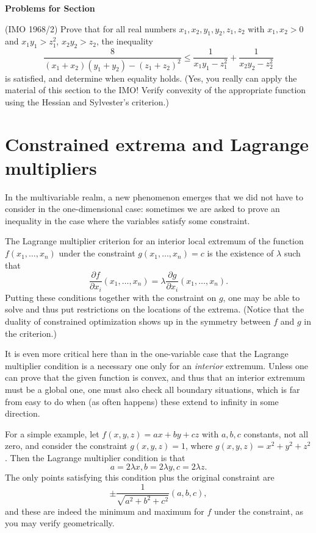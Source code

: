 \documentclass[12pt]{report}
\def\ii{\item}
\newcounter{exc}
\numberwithin{exc}{section}
\newenvironment{exer}{\vspace{0.1in}
\noindent \textbf{Problems for Section~\thesection} \vspace{0.1in}
\begin{list}{\arabic{exc}.}{\usecounter{exc}}}{\end{list}}
\begin{document}
\begin{exer}
\ii (IMO 1968/2)
Prove that for all real numbers $x_{1}, x_{2}, y_{1}, y_{2}, z_{1}, 
z_{2}$ with $x_{1}, x_{2} > 0$ and $x_{1}y_{1} > z_{1}^{2}$, 
$x_{2}y_{2} > z_2$, the inequality
\[
\frac{8}{(x_1+x_2)(y_1+y_2) - (z_1+z_2)^2} \leq 
\frac{1}{x_1y_1-z_1^2} + \frac{1}{x_2y_2-z_2^2}
\]
is satisfied, and determine when equality holds. (Yes, you really can 
apply the material of this section to the IMO! Verify 
convexity of the appropriate function using the Hessian and 
Sylvester's criterion.)
\end{exer}

\section{Constrained extrema and Lagrange multipliers}
In the multivariable realm, a new phenomenon emerges that we did not 
have to consider in the one-dimensional case: sometimes we are asked 
to prove an inequality in the case where the variables satisfy some 
constraint.

The Lagrange multiplier criterion for an interior local extremum of 
the function $f(x_1, \dots, x_n)$ under the constraint $g(x_1, \dots, 
x_n) = c$ is the existence of $\lambda$ such that
\[
\frac{\partial f}{\partial x_i}(x_1, \dots, x_n) =
\lambda \frac{\partial g}{\partial x_i}(x_1, \dots, x_n).
\]
Putting these conditions together with the constraint on $g$, one may 
be able to solve and thus put restrictions on the locations of the 
extrema. (Notice that the duality of constrained 
optimization shows up in the symmetry between $f$ and $g$ in the 
criterion.)

It is even more critical here than in the one-variable case that the 
Lagrange multiplier condition is a necessary one only for an 
\emph{interior} extremum. Unless one can prove that the given function is 
convex, and thus that an interior extremum must be a global one, one 
must also check all boundary situations, which is far from easy to do 
when (as often happens) these extend to infinity in some direction.

For a simple example, let $f(x,y,z) = ax + by + cz$ with $a,b,c$ 
constants, not all zero, and consider the constraint $g(x,y,z)=1$, 
where $g(x,y,z)= x^2+y^2+z^2$. Then the Lagrange multiplier condition 
is that
\[
a = 2 \lambda x, b = 2 \lambda y, c = 2 \lambda z.
\]
The only points satisfying this condition plus the original 
constraint are
\[
\pm \frac{1}{\sqrt{a^2+b^2+c^2}} (a,b,c),
\]
and these are indeed the minimum and maximum for $f$ under the 
constraint, as you may verify geometrically. 
\end{document}
